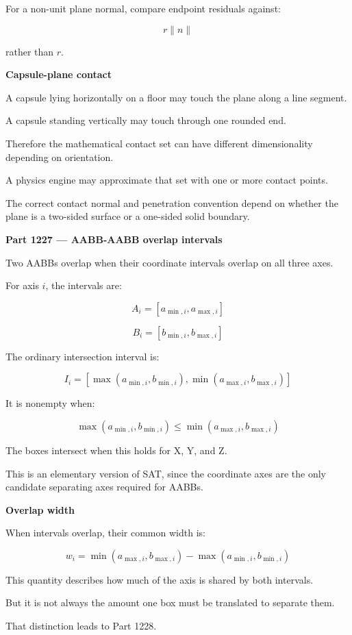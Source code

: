For a non-unit plane normal, compare endpoint residuals against:

\[
r\|n\|
\]

rather than \(r\).

\textbf{Capsule-plane contact}

A capsule lying horizontally on a floor may touch the plane along a line segment.

A capsule standing vertically may touch through one rounded end.

Therefore the mathematical contact set can have different dimensionality depending on orientation.

A physics engine may approximate that set with one or more contact points.

The correct contact normal and penetration convention depend on whether the plane is a two-sided surface or a one-sided solid boundary.

\textbf{Part 1227 --- AABB-AABB overlap intervals}

Two AABBs overlap when their coordinate intervals overlap on all three axes.

For axis \(i\), the intervals are:

\[
A_i=[a_{\min,i},a_{\max,i}]
\]

\[
B_i=[b_{\min,i},b_{\max,i}]
\]

The ordinary intersection interval is:

\[
\boxed{ I_i=[ \max(a_{\min,i},b_{\min,i}), \min(a_{\max,i},b_{\max,i}) ] }
\]

It is nonempty when:

\[
\boxed{ \max(a_{\min,i},b_{\min,i}) \le \min(a_{\max,i},b_{\max,i}) }
\]

The boxes intersect when this holds for X, Y, and Z.

This is an elementary version of SAT, since the coordinate axes are the only candidate separating axes required for AABBs.

\textbf{Overlap width}

When intervals overlap, their common width is:

\[
\boxed{ w_i= \min(a_{\max,i},b_{\max,i}) - \max(a_{\min,i},b_{\min,i}) }
\]

This quantity describes how much of the axis is shared by both intervals.

But it is not always the amount one box must be translated to separate them.

That distinction leads to Part 1228.

